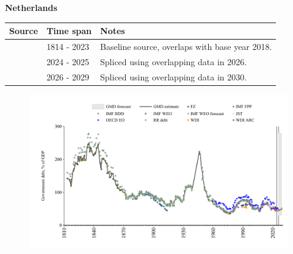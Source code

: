 \documentclass[12pt,a4paper,landscape]{article}
\begin{document}
\begin{adjustbox}{max totalsize={\paperwidth}{\paperheight},center}
\begin{minipage}[t][\textheight][t]{\textwidth}
\vspace*{0.5cm}
{}
\begin{center}
{\Large\bfseries Netherlands}
\end{center}
\vspace{0.5cm}
\begin{table}[H]
\centering
\small
\begin{tabular}{|l|l|l|}
\hline
\textbf{Source} & \textbf{Time span} & \textbf{Notes} \\
\hline
\rowcolor{white}\cite{IMF_FPP}& 1814 - 2023 &Baseline source, overlaps with base year 2018.\\
\rowcolor{lightgray}\cite{OECD_EO}& 2024 - 2025 &Spliced using overlapping data in 2026.\\
\rowcolor{white}\cite{IMF_WEO_forecast}& 2026 - 2029 &Spliced using overlapping data in 2030.\\
\hline
\end{tabular}
\end{table}
\begin{figure}[H]
\centering
\includegraphics[width=\textwidth,height=0.6\textheight,keepaspectratio]{graphs/NLD_govdebt_GDP.pdf}
\end{figure}
\end{minipage}
\end{adjustbox}
\end{document}

